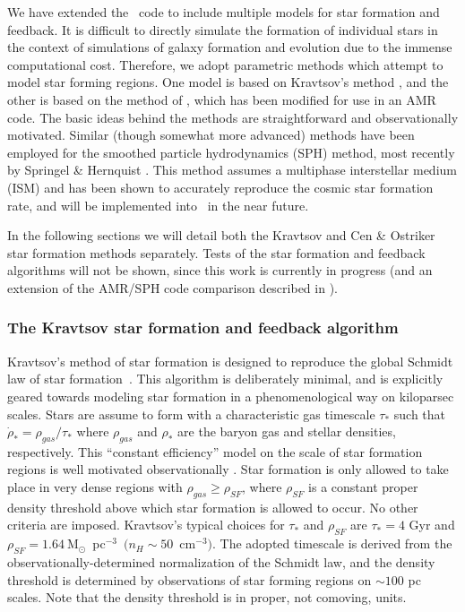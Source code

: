 We have extended the \enzo\ code to include multiple models for star formation
and feedback.  It is difficult to directly simulate the formation of individual
stars in the context of simulations of galaxy formation and evolution due
to the immense computational cost.  Therefore, 
we adopt parametric methods which attempt
to model star forming regions.  One model is based on Kravtsov's method
 \citep{2003ApJ...590L...1K}, and the other is based on the method of 
\citet{CO1992}, which has been modified for use in an AMR code.  The basic
ideas behind the methods are straightforward and observationally motivated.
Similar (though somewhat more advanced) methods have been employed for the 
smoothed particle hydrodynamics
(SPH) method, most recently by Springel \& Hernquist 
\citep{sh03a,sh03b,hs03}. This 
method assumes a
multiphase interstellar medium (ISM) and has been shown to accurately reproduce the cosmic star
formation rate, and will be implemented into \enzo\ in the near future.

In the following sections we will detail both the Kravtsov and Cen \& Ostriker
star formation methods separately.  Tests of the star formation and
feedback algorithms will not be shown, since this work is currently in
progress (and an extension of the AMR/SPH code comparison described in
\citet{2005ApJS..160....1O}).

\subsubsection{The Kravtsov star formation and feedback algorithm}

Kravtsov's method of star formation is designed to reproduce
the global Schmidt law of star 
formation~\citep{2003ApJ...590L...1K,1959ApJ...129..243S}.
This algorithm is deliberately minimal, and is explicitly geared
towards modeling star formation in a phenomenological way on kiloparsec
scales.  Stars are assume to form with a characteristic gas timescale 
$\tau_*$ such that $\dot{\rho}_* = \rho_{gas}/\tau_*$ where $\rho_{gas}$ 
and $\rho_*$ are the baryon gas and stellar densities, respectively.  
This ``constant efficiency'' model on the scale of star formation 
regions is well motivated observationally \citep{1996AJ....112.1903Y,2002ApJ...569..157W}.  
Star formation is only allowed to take place in very dense regions
with $\rho_{gas} \geq \rho_{SF}$, where $\rho_{SF}$ is a constant
proper density threshold above which star formation is allowed to
occur.  No other criteria are imposed.  Kravtsov's typical choices
for $\tau_*$ and $\rho_{SF}$ are $\tau_* = 4$ Gyr and $\rho_{SF} =
1.64~$M$_\odot$~pc$^{-3}$~$(n_H \sim 50$~cm$^{-3})$.  The adopted timescale
is derived from the observationally-determined normalization of the
Schmidt law, and the density threshold is determined by observations
of star forming regions on $\sim 100$ pc scales.  Note that the density
threshold is in proper, not comoving, units.

